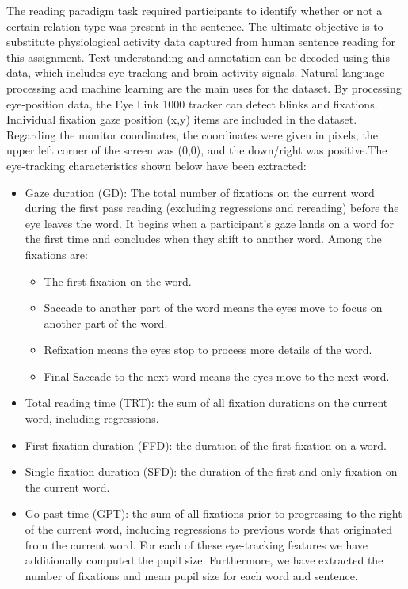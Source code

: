 \documentclass[journal]{IEEEtran}
\begin{document}
The reading paradigm task required participants to identify whether or not a certain relation type was present in the sentence. The ultimate objective is to substitute physiological activity data captured from human sentence reading for this assignment. Text understanding and annotation can be decoded using this data, which includes eye-tracking and brain activity signals. Natural language processing and machine learning are the main uses for the dataset. 
By processing eye-position data, the Eye Link 1000 tracker can detect blinks and fixations. Individual fixation gaze position (x,y) items are included in the dataset. Regarding the monitor coordinates, the coordinates were given in pixels; the upper left corner of the screen was (0,0), and the down/right was positive.The eye-tracking characteristics shown below have been extracted:

\begin{itemize}
	\item Gaze duration (GD): The total number of fixations on the current word during the first pass reading (excluding regressions and rereading) before the eye leaves the word. It begins when a participant's gaze lands on a word for the first time and concludes when they shift to another word. Among the fixations are: 
	      \begin{itemize}
	      	\item The first fixation on the word.
	      	\item Saccade to another part of the word means the eyes move to focus on another part of the word.
	      	\item Refixation means the eyes stop to process more details of the word.
	      	\item Final Saccade to the next word means the eyes move to the next word.
	      \end{itemize}
	\item Total reading time (TRT): the sum of all fixation durations on the current word, including regressions.
	\item First fixation duration (FFD): the duration of the first fixation on a word.
	\item Single fixation duration (SFD): the duration of the first and only fixation on the current word.
	\item Go-past time (GPT): the sum of all fixations prior to progressing to the right of the current word, including regressions to previous words that originated from the current word. For each of these eye-tracking features we have additionally computed the pupil size. Furthermore, we have extracted the number of fixations and mean pupil size for each word and sentence.
\end{itemize}
\end{document}
